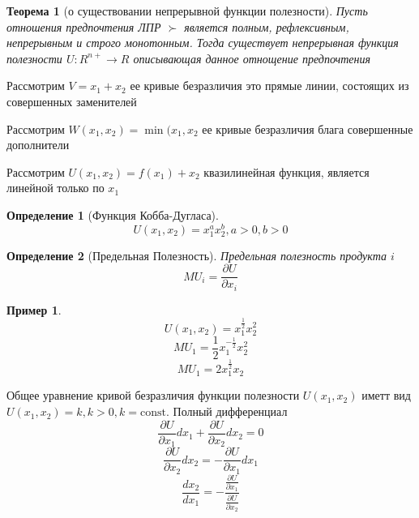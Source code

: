 \documentclass[14pt]{extarticle}
\newtheorem{theorem}{Теорема}
\newtheorem{definition}{Определение}
\newtheorem{example}{Пример}
\begin{document}
	\begin{theorem}[о существовании непрерывной функции полезности]
	Пусть отношения предпочтения ЛПР $\succ$
	является полным, рефлексивным, непрерывным и строго монотонным.
	Тогда существует непрерывная функция полезности  $U:R^{n+} \to R$ описывающая данное отнощение предпочтения
	\end{theorem}
	Рассмотрим $V = x_1 + x_2$ ее кривые безразличия это
	прямые линии, состоящих из совершенных заменителей

	Рассмотрим $W(x_1,x_2) = \min(x_1,x_2$ ее кривые безразличия
 блага совершенные дополнители


Рассмотрим $U(x_1,x_2) = f(x_1) + x_2$ квазилинейная функция, является линейной только по $x_1$
\begin{definition}[Функция Кобба-Дугласа]
	\begin{equation}
		U(x_1,x_2) = x_1^{a} x_2^{b}, a>0,b>0
	\end{equation}
\end{definition}
\begin{definition}[Предельная Полезность]
	Предельная полезность продукта $i$
	\begin{equation}
		MU_{i} = \frac{\partial U}{\partial x_{i}}
	\end{equation} 
\end{definition}
\begin{example}
	\begin{equation}
	U(x_1,x_2) = x_1^{\frac{1}{2}}x^2_2
	\end{equation} 
	\begin{equation}
	MU_1 = \frac{1}{2} x_1 ^{- \frac{1}{2}}x^2_{2}
	\end{equation} 
	\begin{equation}
	MU_1 = 2 x_1^{\frac{1}{2}} x_2
	\end{equation} 
\end{example}
Общее уравнение кривой безразличия функции 
полезности $U(x_1,x_2)$ иметт вид $U(x_1,x_2) = k, k > 0 , k = \text{const}$. Полный дифференциал
\begin{equation}
\frac{\partial U}{\partial x_{1}} dx_1 + \frac{\partial U}{\partial x_2} dx_2 = 0
\end{equation} 
\begin{equation}
\frac{\partial U}{\partial x_2}dx_2
=-\frac{\partial U}{\partial x_1} dx_1
\end{equation} 
\begin{equation}
	\frac{d x_2}{dx_1}  = -\frac{\frac{\partial U}{\partial x_1}}{\frac{\partial U}{\partial x_2}}
\end{equation} 
\end{document}
